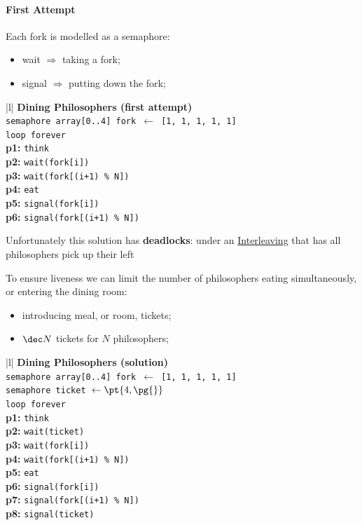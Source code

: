 \paragraph{First Attempt}\label{par:dp_first_attempt} %
Each fork is modelled as a semaphore:
\begin{itemize}
    \item wait $\Rightarrow$ taking a fork;
    \item signal $\Rightarrow$ putting down the fork;
\end{itemize}
\begin{ctable}{|l|}
    \hline
    \textbf{Dining Philosophers (first attempt)} \\
    \hline
    \texttt{semaphore array[0..4] fork $\leftarrow$ [1, 1, 1, 1, 1]} \\
    \hline
    \texttt{loop forever} \\
    \textbf{p1:} \texttt{think} \\
    \textbf{p2:} \texttt{wait(fork[i])} \\
    \textbf{p3:} \texttt{wait(fork[(i+1) \% N])} \\
    \textbf{p4:} \texttt{eat} \\
    \textbf{p5:} \texttt{signal(fork[i])} \\
    \textbf{p6:} \texttt{signal(fork[(i+1) \% N])} \\
    \hline
\end{ctable}
\begin{critical}
    Unfortunately this solution has \textbf{deadlocks}: under an \hyperref[def:interleaving]{Interleaving} that has all philosophers pick up their left
\end{critical}
To ensure liveness we can limit the number of philosophers eating simultaneously, or entering the dining room:
\begin{itemize}
    \item introducing meal, or room, tickets;
    \item $\dec N$ tickets for $N$ philosophers;
\end{itemize}
\begin{ctable}{|l|}
    \hline
    \textbf{Dining Philosophers (solution)} \\
    \hline
    \texttt{semaphore array[0..4] fork $\leftarrow$ [1, 1, 1, 1, 1]} \\
    \texttt{semaphore ticket $\leftarrow \pt{4,\pg{}}$} \\
    \hline
    \texttt{loop forever} \\
    \textbf{p1:} \texttt{think} \\
    \textbf{p2:} \texttt{wait(ticket)} \\
    \textbf{p3:} \texttt{wait(fork[i])} \\
    \textbf{p4:} \texttt{wait(fork[(i+1) \% N])} \\
    \textbf{p5:} \texttt{eat} \\
    \textbf{p6:} \texttt{signal(fork[i])} \\
    \textbf{p7:} \texttt{signal(fork[(i+1) \% N])} \\
    \textbf{p8:} \texttt{signal(ticket)} \\
    \hline
\end{ctable}
